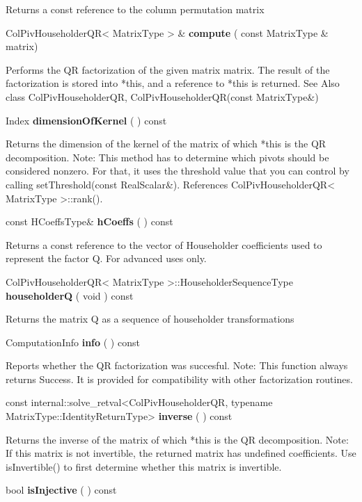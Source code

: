 Returns a const reference to the column permutation matrix 


\vspace{0.3cm}
ColPivHouseholderQR< MatrixType > \& \textbf{compute}  ( const MatrixType \&  matrix)   

Performs the QR factorization of the given matrix matrix. The result of the factorization is stored into *this, and a reference to *this is returned.
See Also class ColPivHouseholderQR, ColPivHouseholderQR(const MatrixType\&) 


\vspace{0.3cm}
Index \textbf{dimensionOfKernel}  ( )  const 

Returns the dimension of the kernel of the matrix of which *this is the QR decomposition.
Note: This method has to determine which pivots should be considered nonzero. For that, it uses the threshold value that you can control by calling setThreshold(const RealScalar\&). References ColPivHouseholderQR< MatrixType >::rank().


\vspace{0.3cm}
const HCoeffsType\& \textbf{hCoeffs}  ( )  const 

Returns a const reference to the vector of Householder coefficients used to represent the factor Q.
For advanced uses only. 


\vspace{0.3cm}
ColPivHouseholderQR< MatrixType >::HouseholderSequenceType \textbf{householderQ}  ( void  )  const 

Returns the matrix Q as a sequence of householder transformations 


\vspace{0.3cm}
ComputationInfo \textbf{info}  ( )  const 

Reports whether the QR factorization was succesful. 
Note: This function always returns Success. It is provided for compatibility with other factorization routines. 


\vspace{0.3cm}
const internal::solve\_retval<ColPivHouseholderQR, typename MatrixType::IdentityReturnType> \textbf{inverse}  ( )  const 

Returns the inverse of the matrix of which *this is the QR decomposition.
Note: If this matrix is not invertible, the returned matrix has undefined coefficients. Use isInvertible() to first determine whether this matrix is invertible. 

\vspace{0.3cm}
bool \textbf{isInjective}  ( )  const 

